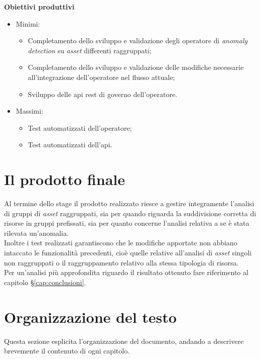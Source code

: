 \noindent \textbf{Obiettivi produttivi}
\begin{itemize}
	\item{Minimi:
		\begin{itemize}
			\item{Completamento dello sviluppo e validazione degli operatore di \textit{anomaly detection} su \textit{asset} differenti raggruppati;}
			\item{Completamento dello sviluppo e validazione delle modifiche necessarie all’integrazione dell’operatore nel flusso attuale;}
			\item{Sviluppo delle \gls{api} \gls{rest} di governo dell’operatore.}
		\end{itemize}			
	}
	\item{Massimi:
		\begin{itemize}
			\item{Test automatizzati dell’operatore;}
			\item{Test automatizzati dell’\gls{api}.}
		\end{itemize}			
	}
\end{itemize}


\section{Il prodotto finale}
Al termine dello stage il prodotto realizzato riesce a gestire integramente l'analisi di gruppi di \textit{asset} raggruppati, sia per quando riguarda la suddivisione corretta di risorse in gruppi prefissati, sia per quanto concerne l'analisi relativa a se è stata rilevata un'anomalia.\\
Inoltre i test realizzati garantiscono che le modifiche apportate non abbiano intaccato le funzionalità precedenti, cioè quelle relative all'analisi di \textit{asset} singoli non raggruppati o il raggruppamento relativo alla stessa tipologia di risorsa.\\
Per un'analisi più approfondita riguardo il risultato ottenuto fare riferimento al capitolo \S\ref{cap:conclusioni}.




\section{Organizzazione del testo}
Questa sezione esplicita l'organizzazione del documento, andando a descrivere brevemente il contenuto di ogni capitolo.

